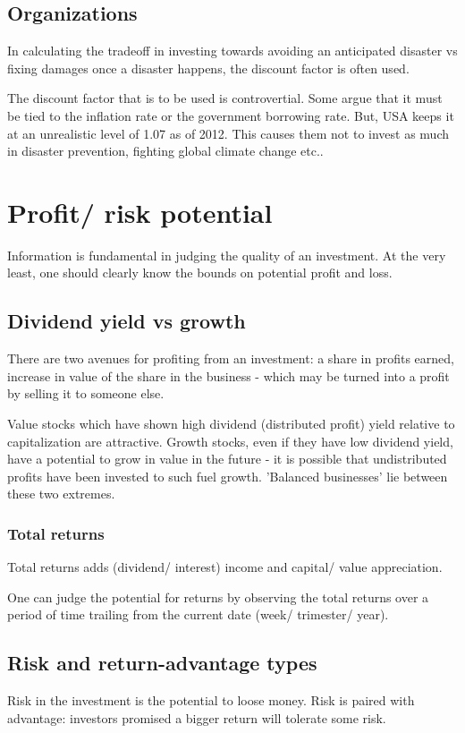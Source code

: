 \documentclass[oneside, article]{memoir}
\begin{document}
\subsection{Organizations}
In calculating the tradeoff in investing towards avoiding an anticipated disaster vs fixing damages once a disaster happens, the discount factor is often used.

The discount factor that is to be used is controvertial. Some argue that it must be tied to the inflation rate or the government borrowing rate. But, USA keeps it at an unrealistic level of 1.07 as of 2012. This causes them not to invest as much in disaster prevention, fighting global climate change etc..

\section{Profit/ risk potential}
Information is fundamental in judging the quality of  an investment. At the very least, one should clearly know the bounds on potential profit and loss.

\subsection{Dividend yield vs growth}
There are two avenues for profiting from an investment: a share in profits earned, increase in value of the share in the business - which may be turned into a profit by selling it to someone else.

Value stocks which have shown high dividend (distributed profit) yield relative to capitalization are attractive. Growth stocks, even if they have low dividend yield, have a potential to grow in value in the future - it is possible that undistributed profits have been invested to such fuel growth. 'Balanced businesses' lie between these two extremes.

\subsubsection{Total returns}
Total returns adds (dividend/ interest) income and capital/ value appreciation.

One can judge the potential for returns by observing the total returns over a period of time trailing from the current date (week/ trimester/ year).

\subsection{Risk and return-advantage types}
Risk in the investment is the potential to loose money. Risk is paired with advantage: investors promised a bigger return will tolerate some risk.
\end{document}
